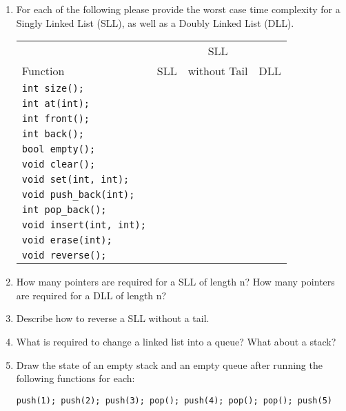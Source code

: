 \documentclass[11pt]{article}
\begin{document}
    \begin{enumerate}
        \item For each of the following please provide the worst case time complexity for a Singly Linked List (SLL), as well as a Doubly Linked List (DLL). 
    
    \begin{tabular}{l | c | c | c}
                 &     & SLL          &  \\ 
        Function & SLL & without Tail & DLL \\ \hline
        \verb|int size();| & & & \\ \hline
        \verb|int at(int);| & & & \\ \hline
        \verb|int front();| & & & \\ \hline
        \verb|int back();| & & & \\ \hline
        \verb|bool empty();| & & & \\ \hline
        \verb|void clear();| & & & \\ \hline
        \verb|void set(int, int);| & & & \\ \hline
        \verb|void push_back(int);| & & & \\ \hline
        \verb|int pop_back();| & & & \\ \hline
        \verb|void insert(int, int);| & & & \\ \hline
        \verb|void erase(int);| & & & \\ \hline
        \verb|void reverse();| & & & \\ \hline
    \end{tabular}
    
        \item How many pointers are required for a SLL of length n? How many pointers are required for a DLL of length n?
        
        \item Describe how to reverse a SLL without a tail.
        
        \item What is required to change a linked list into a queue? What about a stack?
        
        \item Draw the state of an empty stack and an empty queue after running the following functions for each:
\begin{verbatim}
push(1); push(2); push(3); pop(); push(4); pop(); pop(); push(5)
\end{verbatim}
    \end{enumerate}
    \label{r:lastpage}
    
\end{document}
